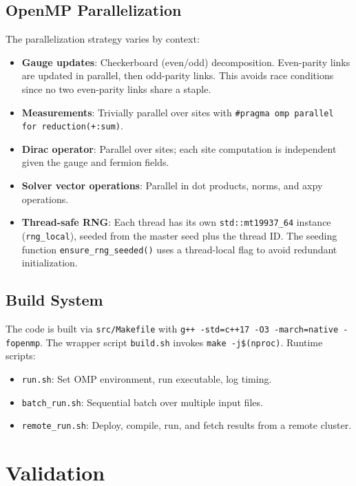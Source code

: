 \documentclass[12pt]{article}
\newcommand{\code}[1]{\texttt{#1}}
\begin{document}
\subsection{OpenMP Parallelization}

The parallelization strategy varies by context:
\begin{itemize}
\item \textbf{Gauge updates}: Checkerboard (even/odd) decomposition. Even-parity links are updated in parallel, then odd-parity links. This avoids race conditions since no two even-parity links share a staple.
\item \textbf{Measurements}: Trivially parallel over sites with \code{\#pragma omp parallel for reduction(+:sum)}.
\item \textbf{Dirac operator}: Parallel over sites; each site computation is independent given the gauge and fermion fields.
\item \textbf{Solver vector operations}: Parallel in dot products, norms, and axpy operations.
\item \textbf{Thread-safe RNG}: Each thread has its own \code{std::mt19937\_64} instance (\code{rng\_local}), seeded from the master seed plus the thread ID. The seeding function \code{ensure\_rng\_seeded()} uses a thread-local flag to avoid redundant initialization.
\end{itemize}

\subsection{Build System}

The code is built via \code{src/Makefile} with \code{g++ -std=c++17 -O3 -march=native -fopenmp}. The wrapper script \code{build.sh} invokes \code{make -j\$(nproc)}. Runtime scripts:
\begin{itemize}
\item \code{run.sh}: Set OMP environment, run executable, log timing.
\item \code{batch\_run.sh}: Sequential batch over multiple input files.
\item \code{remote\_run.sh}: Deploy, compile, run, and fetch results from a remote cluster.
\end{itemize}


\section{Validation}
\label{sec:validation}
\end{document}
